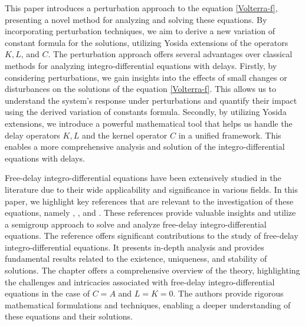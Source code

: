 \documentclass[12pt]{amsart}
\theoremstyle{definition}
\theoremstyle{remark}
\theoremstyle{example}
\begin{document}
This paper introduces a perturbation approach to the equation \eqref{Volterra-f}, presenting a novel method for analyzing and solving these equations. By incorporating perturbation techniques, we aim to derive a new variation of constant formula for the solutions, utilizing Yosida extensions of the  operators $K,L$, and $C$. The perturbation approach offers several advantages over classical methods for analyzing integro-differential equations with delays. Firstly, by considering perturbations, we gain insights into the effects of small changes or disturbances on the solutions of the equation \eqref{Volterra-f}. This allows us to understand the system's response under perturbations and quantify their impact using the derived variation of constants formula. Secondly, by utilizing Yosida extensions, we introduce a powerful mathematical tool that helps us handle the delay operators $K,L$ and the kernel operator $C$ in a unified framework. This enables a more comprehensive analysis and solution of the integro-differential equations with delays.

Free-delay integro-differential equations have been extensively studied in the literature due to their wide applicability and significance in various fields. In this paper, we highlight key references that are relevant to the investigation of these equations, namely \cite{DS}, \cite[Chap.VI, Section 7(c)]{EngNag}, and \cite{Pruss}. These references provide valuable insights and utilize a semigroup approach to solve and analyze free-delay integro-differential equations. The reference \cite{DS} offers significant contributions to the study of free-delay integro-differential equations. It presents in-depth analysis and provides fundamental results related to the existence, uniqueness, and stability of solutions. The chapter \cite[Chap.VI, Section 7(c)]{EngNag} offers a comprehensive overview of the theory, highlighting the challenges and intricacies associated with free-delay integro-differential equations in the case of $C=A$ and $L=K=0$. The authors provide rigorous mathematical formulations and techniques, enabling a deeper understanding of these equations and their solutions.
\end{document}
